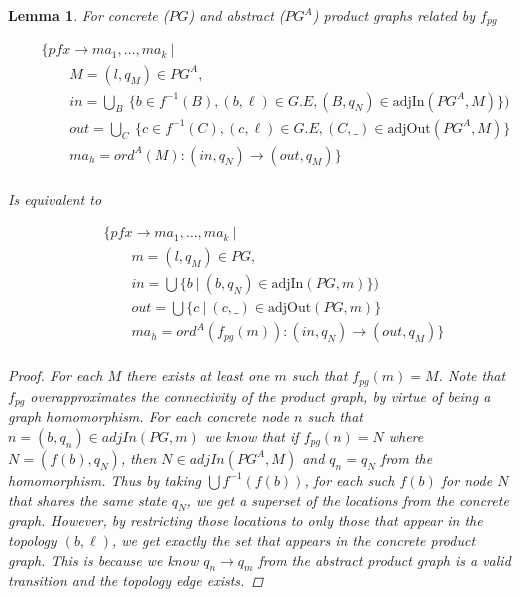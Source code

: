 \documentclass[twocolumn]{sig-alternate-10pt}
\newtheorem{lem}[thm]{Lemma}
\begin{document}
\begin{lem}

  For concrete ($PG$) and abstract ($PG^A$) product graphs related by $f_{pg}$

  \[ \begin{array}{l}
     ~~~~~~~~~ \{ pfx \rightarrow ma_1, \dots, ma_k ~\vert~ \\
     ~~~~~~~~~~~~~~~~~~ M = (l,q_M) \in PG^A, \\
     ~~~~~~~~~~~~~~~~~~ in = \bigcup_B~ \{ b \in f^{-1}(B), (b,\ell) \in G.E, (B,q_N) \in \text{adjIn}(PG^A,M) \}) \\
     ~~~~~~~~~~~~~~~~~~ out = \bigcup_C~ \{ c \in f^{-1}(C), (c,\ell) \in G.E, (C,\_) \in \text{adjOut}(PG^A,M) \} \\
     ~~~~~~~~~~~~~~~~~~ ma_h = ord^A(M) : (in,q_N) \rightarrow (out,q_M) \} \\
  \end{array} \]%

  Is equivalent to

  \[ \begin{array}{l}
     ~~~~~~~~~ \{ pfx \rightarrow ma_1, \dots, ma_k ~\vert~ \\
     ~~~~~~~~~~~~~~~~~~ m = (l,q_M) \in PG, \\
     ~~~~~~~~~~~~~~~~~~ in = \bigcup \{ b ~\vert~ (b,q_N) \in \text{adjIn}(PG,m) \}) \\
     ~~~~~~~~~~~~~~~~~~ out = \bigcup \{ c ~\vert~ (c,\_) \in \text{adjOut}(PG,m) \} \\
     ~~~~~~~~~~~~~~~~~~ ma_h = ord^A(f_{pg}(m)) : (in,q_N) \rightarrow (out,q_M) \} \\
  \end{array} \]%

  \begin{proof}
    For each $M$ there exists at least one $m$ such that $f_{pg}(m) = M$. Note that $f_{pg}$ overapproximates the connectivity of the product graph, by virtue of being a graph homomorphism. For each concrete node $n$ such that $n = (b,q_n) \in adjIn(PG,m)$ we know that if $f_{pg}(n) = N$ where $N = (f(b),q_N)$, then $N \in adjIn(PG^A,M)$ and $q_n = q_N$ from the homomorphism. Thus by taking $\bigcup f^{-1}(f(b))$, for each such $f(b)$ for node $N$ that shares the same state $q_N$, we get a superset of the locations from the concrete graph. However, by restricting those locations to only those that appear in the topology $(b,\ell)$, we get exactly the set that appears in the concrete product graph. This is because we know $q_n \rightarrow q_m$ from the abstract product graph is a valid transition and the topology edge exists.
  \end{proof}

\end{lem}
\end{document}
